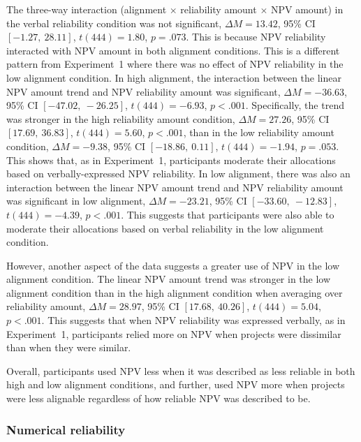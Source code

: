 \documentclass[a4paper, nobind, dvipsnames]{templates/ociamthesis}
\theoremstyle{definition}
\theoremstyle{definition}
\theoremstyle{definition}
\theoremstyle{definition}
\theoremstyle{remark}
\begin{document}
The three-way interaction (alignment \(\times\) reliability amount \(\times\) NPV
amount) in the verbal reliability condition was not significant,
\(\Delta M = 13.42\), 95\% CI \([-1.27,~28.11]\), \(t(444) = 1.80\), \(p = .073\). This is
because NPV reliability interacted with NPV amount in both alignment conditions.
This is a different pattern from Experiment~1 where there was no effect of NPV
reliability in the low alignment condition. In high alignment, the interaction
between the linear NPV amount trend and NPV reliability amount was significant,
\(\Delta M = -36.63\), 95\% CI \([-47.02,~-26.25]\), \(t(444) = -6.93\), \(p < .001\).
Specifically, the trend was stronger in the high reliability amount condition,
\(\Delta M = 27.26\), 95\% CI \([17.69,~36.83]\), \(t(444) = 5.60\), \(p < .001\),
than in the low reliability amount condition,
\(\Delta M = -9.38\), 95\% CI \([-18.86,~0.11]\), \(t(444) = -1.94\), \(p = .053\).
This shows that, as in Experiment~1, participants moderate their allocations
based on verbally-expressed NPV reliability. In low alignment, there was also an
interaction between the linear NPV amount trend and NPV reliability amount was
significant in low alignment,
\(\Delta M = -23.21\), 95\% CI \([-33.60,~-12.83]\), \(t(444) = -4.39\), \(p < .001\).
This suggests that participants were also able to moderate their allocations
based on verbal reliability in the low alignment condition.

However, another aspect of the data suggests a greater use of NPV in the low
alignment condition. The linear NPV amount trend was stronger in the low
alignment condition than in the high alignment condition when averaging over
reliability amount,
\(\Delta M = 28.97\), 95\% CI \([17.68,~40.26]\), \(t(444) = 5.04\), \(p < .001\). This
suggests that when NPV reliability was expressed verbally, as in Experiment~1,
participants relied more on NPV when projects were dissimilar than when they
were similar.

Overall, participants used NPV less when it was described as less reliable in
both high and low alignment conditions, and further, used NPV more when projects
were less alignable regardless of how reliable NPV was described to be.

\subsubsection{Numerical reliability}
\end{document}
